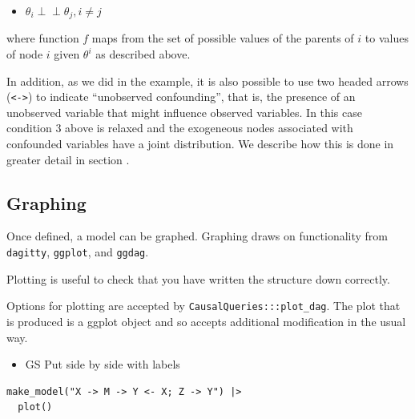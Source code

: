\documentclass[
  article]{jss}
\providecommand{\tightlist}{%
  \setlength{\itemsep}{0pt}\setlength{\parskip}{0pt}}\usepackage{longtable,booktabs,array}
\begin{document}
\begin{itemize}
\tightlist
\item
  \(\theta_i \perp\!\!\! \perp \theta_j, i\neq j\)
\end{itemize}

where function \(f\) maps from the set of possible values of the parents
of \(i\) to values of node \(i\) given \(\theta^i\) as described above.

In addition, as we did in the \citet{chickering1996clinician} example,
it is also possible to use two headed arrows
(\texttt{\textless{}-\textgreater{}}) to indicate ``unobserved
confounding'', that is, the presence of an unobserved variable that
might influence observed variables. In this case condition 3 above is
relaxed and the exogeneous nodes associated with confounded variables
have a joint distribution. We describe how this is done in greater
detail in section \citet{confounding}.

\hypertarget{graphing}{%
\subsection{Graphing}\label{graphing}}

Once defined, a model can be graphed. Graphing draws on functionality
from \texttt{dagitty}, \texttt{ggplot}, and \texttt{ggdag}.

Plotting is useful to check that you have written the structure down
correctly.

Options for plotting are accepted by \texttt{CausalQueries:::plot\_dag}.
The plot that is produced is a ggplot object and so accepts additional
modification in the usual way.

\begin{itemize}
\tightlist
\item
  GS Put side by side with labels
\end{itemize}

\begin{verbatim}
make_model("X -> M -> Y <- X; Z -> Y") |>
  plot()
\end{verbatim}
\end{document}
